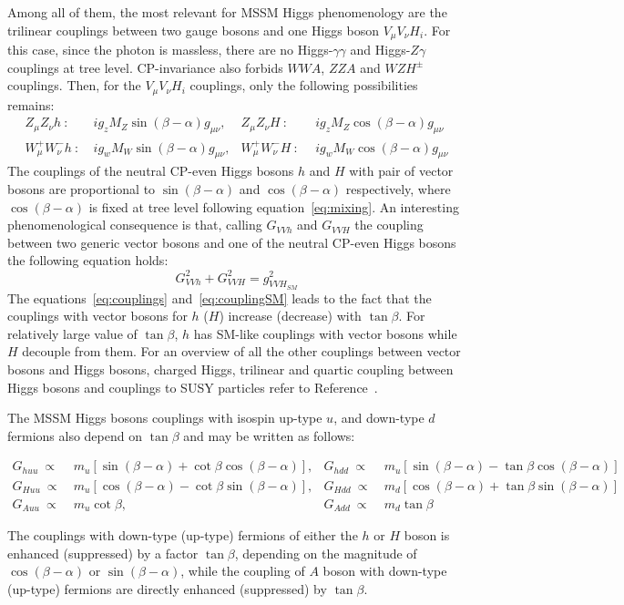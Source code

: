 Among all of them, the most relevant for MSSM Higgs phenomenology are the trilinear couplings between two gauge bosons and one Higgs boson $V_{\mu}V_{\nu}H_i$.
For this case, since the photon is massless, there are no Higgs-$\gamma\gamma$ and Higgs-$Z\gamma$ couplings at tree level. CP-invariance also forbids $WWA$, $ZZA$
and $WZH^{\pm}$ couplings. Then, for the $V_{\mu}V_{\nu}H_i$ couplings, only the following possibilities remains:
\begin{align} 
Z_{\mu}Z_{\nu} h ~ :  ~ & ig_z M_Z \sin(\beta -\alpha) g_{\mu\nu},  &  Z_{\mu}Z_{\nu} H ~ : ~  ~    & ig_z M_Z \cos(\beta -\alpha) g_{\mu\nu} \\
W_{\mu}^+W_{\nu}^- h ~: ~&  ig_w M_W \sin(\beta -\alpha) g_{\mu\nu},  &  W_{\mu}^+W_{\nu}^- H ~ : ~ ~ & ig_w M_W \cos(\beta -\alpha) g_{\mu\nu} \label{eq:couplings} 
\end{align}
The couplings of the neutral CP-even Higgs bosons $h$ and $H$ with pair of vector bosons are proportional to $ \sin(\beta -\alpha)$ and $\cos(\beta -\alpha)$
respectively, where $\cos(\beta -\alpha)$ is fixed at tree level following equation~\eqref{eq:mixing}. An interesting phenomenological consequence is
that, calling $G_{VVh}$ and $G_{VVH}$ the coupling between two generic vector bosons and one of the neutral CP-even Higgs bosons the following equation holds:
\begin{equation}\label{eq:couplingSM}
G^2_{VVh} +G^2_{VVH} = g^2_{VVH_{SM}}
\end{equation}
The equations~\eqref{eq:couplings} and~\eqref{eq:couplingSM} leads to the fact that the couplings with vector bosons for $h$ ($H$) 
increase (decrease) with $\tan\beta$. For relatively large value of $\tan\beta$, $h$ has SM-like couplings with vector bosons while
 $H$  decouple from them. For an overview of all the other
couplings between vector bosons and Higgs bosons, charged Higgs, trilinear and quartic coupling between Higgs bosons and couplings 
to SUSY particles refer to Reference~\cite{Djuadi}.

The MSSM Higgs bosons couplings with isospin up-type $u$, and down-type $d$ fermions also depend on $\tan\beta$ and may be written
as follows:
\begin{small}
\begin{align*}
G_{huu} ~\propto ~ & m_u [\sin(\beta - \alpha)  + \cot\beta \cos(\beta - \alpha)], & G_{hdd} ~\propto ~ & m_u [\sin(\beta - \alpha)  - \tan\beta \cos(\beta - \alpha)]\\
G_{Huu} ~\propto ~& m_u [\cos(\beta - \alpha)  - \cot\beta \sin(\beta - \alpha)], & G_{Hdd} ~\propto~  & m_d [\cos(\beta - \alpha)  + \tan\beta \sin(\beta - \alpha)]\\
G_{Auu} ~ \propto ~ & m_u  \cot\beta, & G_{Add} ~ \propto ~ & m_d \tan\beta 
\end{align*} 
\end{small}
The couplings with down-type (up-type) fermions of either the $h$ or $H$ boson is enhanced (suppressed) by a factor $\tan\beta$, depending
on the magnitude of $\cos(\beta - \alpha)$ or $\sin(\beta - \alpha)$, while the coupling of $A$ boson with down-type (up-type) fermions are directly 
enhanced (suppressed) by $\tan\beta$.


